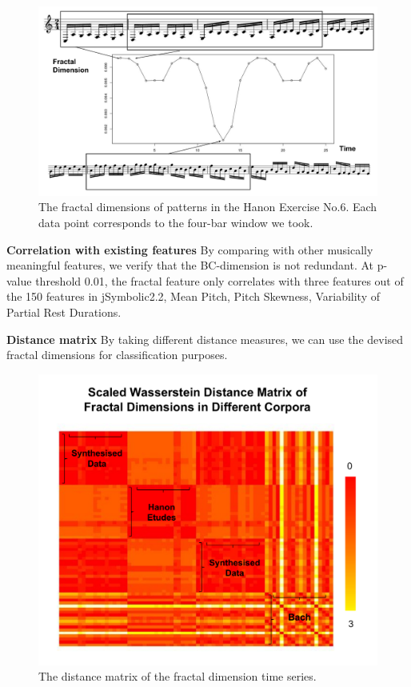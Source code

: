 \begin{figure}
  \includegraphics[width=\linewidth]{src/img/frac-simpeg.pdf}
  \caption{The fractal dimensions of patterns in the Hanon Exercise No.6. Each data point corresponds to the four-bar window we took.  }
  \label{fig:simpeg}
\end{figure}

\textbf{Correlation with existing features}
By comparing with other musically meaningful features, we verify that the BC-dimension is not redundant. 
At p-value threshold 0.01, the fractal feature only correlates with three features out of the 150 features in jSymbolic2.2, Mean Pitch, Pitch Skewness, Variability of Partial Rest Durations. 

\textbf{Distance matrix}
By taking different distance measures, we can use the devised fractal dimensions for classification purposes.
\begin{figure}
  \includegraphics[width=\linewidth]{src/img/fragemdist.pdf}
  \caption{The distance matrix of the fractal dimension time series. }
  \label{fig:simpeg}
\end{figure}

